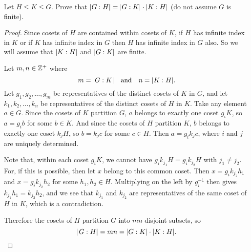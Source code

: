 \label{exercise:quotient-group:subgroup-of-subgroup-index}
Let $H\leq K\leq G$. Prove that $\lvert{G:H}\rvert = \lvert{G:K}\rvert\cdot\lvert{K:H}\rvert$
(do not assume $G$ is finite).
\begin{proof}
  Since cosets of $H$ are contained within cosets of $K$, if $H$ has
  infinite index in $K$ or if $K$ has infinite index in $G$ then $H$
  has infinite index in $G$ also. So we will assume that $\lvert{K:H}\rvert$
  and $\lvert{G:K}\rvert$ are finite.

  Let $m,n\in\mathbb{Z}^+$ where
  \begin{equation*}
    m = \lvert{G:K}\rvert
    \quad\text{and}\quad
    n = \lvert{K:H}\rvert.
  \end{equation*}
  Let $g_1,g_2,\dots,g_m$ be representatives of the distinct cosets of
  $K$ in $G$, and let $k_1,k_2,\dots,k_n$ be representatives of the
  distinct cosets of $H$ in $K$. Take any element $a\in G$. Since the
  cosets of $K$ partition $G$, $a$ belongs to exactly one coset
  $g_iK$, so $a = g_ib$ for some $b\in K$. And since the cosets of $H$
  partition $K$, $b$ belongs to exactly one coset $k_jH$, so
  $b = k_jc$ for some $c\in H$. Then $a = g_ik_jc$, where $i$ and $j$
  are uniquely determined.

  Note that, within each coset $g_iK$, we cannot have
  $g_ik_{j_1}H = g_ik_{j_2}H$ with $j_1\neq j_2$. For, if this is
  possible, then let $x$ belong to this common coset. Then
  $x = g_ik_{j_1}h_1$ and $x = g_ik_{j_2}h_2$ for some $h_1,h_2\in
  H$. Multiplying on the left by $g_i^{-1}$ then gives
  $k_{j_1}h_1 = k_{j_2}h_2$, and we see that $k_{j_1}$ and $k_{j_2}$
  are representatives of the same coset of $H$ in $K$, which is a
  contradiction.

  Therefore the cosets of $H$ partition $G$ into $mn$ disjoint
  subsets, so
  \begin{equation*}
    \lvert{G:H}\rvert = mn = \lvert{G:K}\rvert\cdot\lvert{K:H}\rvert. \qedhere
  \end{equation*}
\end{proof}
